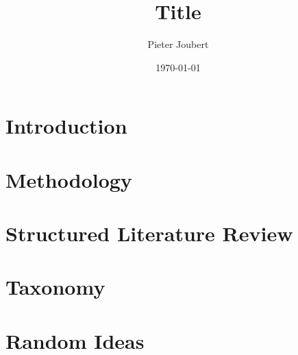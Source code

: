 \documentclass{report}
\begin{document}
\title{Title}
\author{Pieter Joubert}
\date{\today}
\maketitle 

\tableofcontents
\listoffigures

\chapter{Introduction}


\chapter{Methodology}


\chapter{Structured Literature Review}


\chapter{Taxonomy}


\chapter{Random Ideas}




\end{document}
